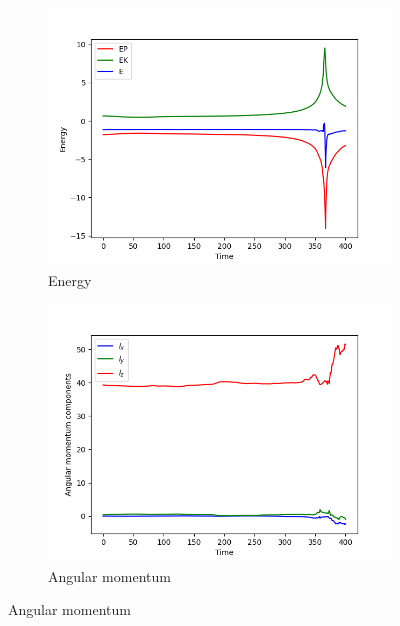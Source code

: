 \begin{figure}[htp]
    \centering
    \begin{subfigure}[b]{0.45\textwidth}
        \centering
        \includegraphics[width=\textwidth]{chapters/results/img/bh-collision/energy.png}
        \caption{Energy}
        \label{fig:physical-quantities-bh-collision-sub1}
    \end{subfigure}
    \hfill
    \begin{subfigure}[b]{0.45\textwidth}
        \centering
        \includegraphics[width=\textwidth]{chapters/results/img/bh-collision/angular-momentum.png}
        \caption{Angular momentum}
        \label{fig:physical-quantities-bh-collision-sub2}
    \end{subfigure}


\end{figure}
